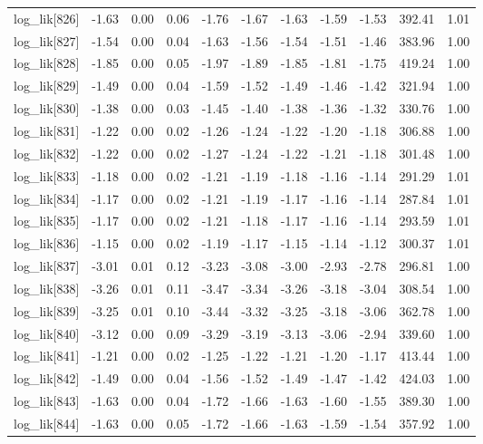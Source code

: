 \begin{table}[ht]
\begin{tabular}{rrrrrrrrrrr}
  log\_lik[826] & -1.63 & 0.00 & 0.06 & -1.76 & -1.67 & -1.63 & -1.59 & -1.53 & 392.41 & 1.01 \\ 
  log\_lik[827] & -1.54 & 0.00 & 0.04 & -1.63 & -1.56 & -1.54 & -1.51 & -1.46 & 383.96 & 1.00 \\ 
  log\_lik[828] & -1.85 & 0.00 & 0.05 & -1.97 & -1.89 & -1.85 & -1.81 & -1.75 & 419.24 & 1.00 \\ 
  log\_lik[829] & -1.49 & 0.00 & 0.04 & -1.59 & -1.52 & -1.49 & -1.46 & -1.42 & 321.94 & 1.00 \\ 
  log\_lik[830] & -1.38 & 0.00 & 0.03 & -1.45 & -1.40 & -1.38 & -1.36 & -1.32 & 330.76 & 1.00 \\ 
  log\_lik[831] & -1.22 & 0.00 & 0.02 & -1.26 & -1.24 & -1.22 & -1.20 & -1.18 & 306.88 & 1.00 \\ 
  log\_lik[832] & -1.22 & 0.00 & 0.02 & -1.27 & -1.24 & -1.22 & -1.21 & -1.18 & 301.48 & 1.00 \\ 
  log\_lik[833] & -1.18 & 0.00 & 0.02 & -1.21 & -1.19 & -1.18 & -1.16 & -1.14 & 291.29 & 1.01 \\ 
  log\_lik[834] & -1.17 & 0.00 & 0.02 & -1.21 & -1.19 & -1.17 & -1.16 & -1.14 & 287.84 & 1.01 \\ 
  log\_lik[835] & -1.17 & 0.00 & 0.02 & -1.21 & -1.18 & -1.17 & -1.16 & -1.14 & 293.59 & 1.01 \\ 
  log\_lik[836] & -1.15 & 0.00 & 0.02 & -1.19 & -1.17 & -1.15 & -1.14 & -1.12 & 300.37 & 1.01 \\ 
  log\_lik[837] & -3.01 & 0.01 & 0.12 & -3.23 & -3.08 & -3.00 & -2.93 & -2.78 & 296.81 & 1.00 \\ 
  log\_lik[838] & -3.26 & 0.01 & 0.11 & -3.47 & -3.34 & -3.26 & -3.18 & -3.04 & 308.54 & 1.00 \\ 
  log\_lik[839] & -3.25 & 0.01 & 0.10 & -3.44 & -3.32 & -3.25 & -3.18 & -3.06 & 362.78 & 1.00 \\ 
  log\_lik[840] & -3.12 & 0.00 & 0.09 & -3.29 & -3.19 & -3.13 & -3.06 & -2.94 & 339.60 & 1.00 \\ 
  log\_lik[841] & -1.21 & 0.00 & 0.02 & -1.25 & -1.22 & -1.21 & -1.20 & -1.17 & 413.44 & 1.00 \\ 
  log\_lik[842] & -1.49 & 0.00 & 0.04 & -1.56 & -1.52 & -1.49 & -1.47 & -1.42 & 424.03 & 1.00 \\ 
  log\_lik[843] & -1.63 & 0.00 & 0.04 & -1.72 & -1.66 & -1.63 & -1.60 & -1.55 & 389.30 & 1.00 \\ 
  log\_lik[844] & -1.63 & 0.00 & 0.05 & -1.72 & -1.66 & -1.63 & -1.59 & -1.54 & 357.92 & 1.00 \\ 

\end{tabular}
\end{table}
